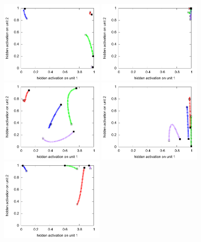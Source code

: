 \begin{figure}[h]
  \centering
  \includegraphics[width=0.45\textwidth]{img/hid-tlr-bad-static.pdf}  
  \includegraphics[width=0.45\textwidth]{img/hid-tlr-bad-tiny.pdf}  
  \includegraphics[width=0.45\textwidth]{img/hid-tlr-bad-init.pdf}  
  \includegraphics[width=0.45\textwidth]{img/hid-tlr-bad-weird.pdf}  
  \includegraphics[width=0.45\textwidth]{img/hid-tlr-good-static.pdf}  

\end{figure}

